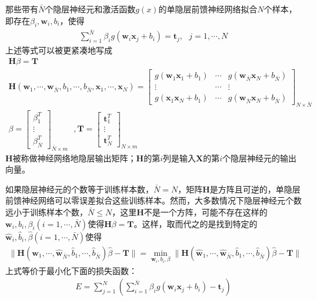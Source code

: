\documentclass[supercite]{HustGraduPaper}
\begin{document}
\begin{sloppypar}
  那些带有$\bar{N}$个隐层神经元和激活函数$g(x)$的单隐层前馈神经网络拟合$N$个样本，即存在$\beta_i,\bm{w}_i,b_i$，使得\begin{gather}
   \sum\limits^{\bar{N}}_{i=1}\beta_ig(\bm{w}_i\bm{x}_j+b_i)=\bm{t}_j,\text{  }j=1,\cdots,N
  \end{gather}
  上述等式可以被更紧凑地写成\begin{gather}
   \mathbf{H}\beta=\mathbf{T}\\
   \mathbf{H}(\bm{w}_1,\cdots,\bm{w}_{\bar{N}},b_1,\cdots,b_{\bar{N}},\bm{x}_1,\cdots,\bm{x}_N)=\begin{bmatrix}
     g(\bm{w}_1\bm{x}_1+b_1)&\cdots&g(\bm{w}_{\bar{N}}\bm{x}_N+b_{\bar{N}})\\
     \vdots&\cdots&\vdots\\
     g(\bm{x}_1\bm{x}_N+b_1)&\cdots&g(\bm{w}_{\bar{N}}\bm{x}_N+b_{\bar{N}})
   \end{bmatrix}_{N\times\bar{N}}\\
   \beta=\begin{bmatrix}
      \beta^T_1\\
      \vdots\\
      \beta^T_{\bar{N}}
   \end{bmatrix}_{\bar{N}\times m}\text{  },\mathbf{T}=\begin{bmatrix}
    \bm{t}^T_1\\
    \vdots\\
    \bm{t}^T_N
   \end{bmatrix}_{N\times m}
  \end{gather}
  $\mathbf{H}$被称做神经网络地隐层输出矩阵；$\mathbf{H}$的第$i$列是输入$\mathbf{X}$的第$i$个隐层神经元的输出向量。

  如果隐层神经元的个数等于训练样本数，$\bar{N}=N$，矩阵$\mathbf{H}$是方阵且可逆的，单隐层前馈神经网络可以零误差拟合这些训练样本。然而，大多数情况下隐层神经元个数远小于训练样本个数，$\bar{N}\leq N$，这里$\mathbf{H}$不是一个方阵，可能不存在这样的$\bm{w}_i,b_i,\beta_i(i=1,\cdots,\bar{N})$使得$\mathbf{H}\beta=\mathbf{T}$。这样，取而代之的是找到特定的$\hat{\bm{w}}_i,\hat{b}_i,\hat{\beta}(i=1,\cdots,\bar{N})$使得\begin{gather}
   \lVert\mathbf{H}(\hat{\bm{w}}_1,\cdots,\hat{\bm{w}}_{\bar{N}},\hat{b}_1,\cdots,\hat{b}_{\bar{N}})\hat{\beta}-\mathbf{T}\rVert=\min\limits_{\bm{w}_i,b_i,\beta}\lVert\mathbf{H}(\hat{\bm{w}}_1,\cdots,\hat{\bm{w}}_{\bar{N}},\hat{b}_1,\cdots,\hat{b}_{\bar{N}})\hat{\beta}-\mathbf{T}\rVert
  \end{gather}
  上式等价于最小化下面的损失函数：\begin{gather}
   E=\sum\limits^N_{j=1}\left( \sum\limits^{\bar{N}}_{i=1}\beta_ig(\bm{w}_i\bm{x}_j+b_i)-\bm{t}_j \right)
  \end{gather}


\end{sloppypar}
\end{document}
